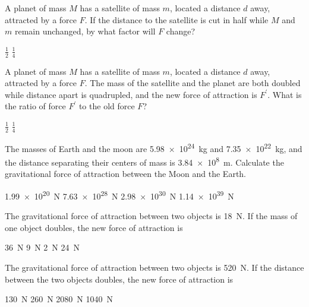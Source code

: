 \documentclass[../main-physics-problems.tex]{subfiles}
\begin{document}
\begin{questions}
\question
A planet of mass $M$ has a satellite of mass $m$, located a distance $d$ away, attracted by a force $F$. If the distance to the satellite is cut in half while $M$ and $m$ remain unchanged, by what factor will $F$ change?

\begin{randomizechoices}
    \choice $\frac{1}{2}$
    \choice $\frac{1}{4}$
\end{randomizechoices}

\question
A planet of mass $M$ has a satellite of mass $m$, located a distance $d$ away, attracted by a force $F$. The mass of the satellite and the planet are both doubled while distance apart is quadrupled, and the new force of attraction is $F^\prime$. What is the ratio of force $F^\prime$ to the old force $F$?

\begin{randomizechoices}
    \choice $\frac{1}{2}$
    \correctchoice $\frac{1}{4}$
\end{randomizechoices}

\question
The masses of Earth and the moon are \SI{5.98e24}{kg} and \SI{7.35e22}{kg}, and the distance separating their centers of mass is \SI{3.84e8}{m}. Calculate the gravitational force of attraction between the Moon and the Earth.

\begin{randomizechoices}
    \correctchoice \SI{1.99e20}{N}
    \choice \SI{7.63e28}{N}
    \choice \SI{2.98e30}{N}
    \choice \SI{1.14e39}{N}
\end{randomizechoices}

\question
The gravitational force of attraction between two objects is \SI{18}{N}. If the mass of one object doubles, the new force of attraction is

\begin{randomizechoices}
    \correctchoice \SI{36}{N}
    \choice \SI{9}{N}
    \choice \SI{2}{N}
    \choice \SI{24}{N}
\end{randomizechoices}

\question
The gravitational force of attraction between two objects is \SI{520}{N}. If the distance between the two objects doubles, the new force of attraction is

\begin{randomizechoices}
    \correctchoice \SI{130}{N}
    \choice \SI{260}{N}
    \choice \SI{2080}{N}
    \choice \SI{1040}{N}
\end{randomizechoices}


\end{questions}
\end{document}
